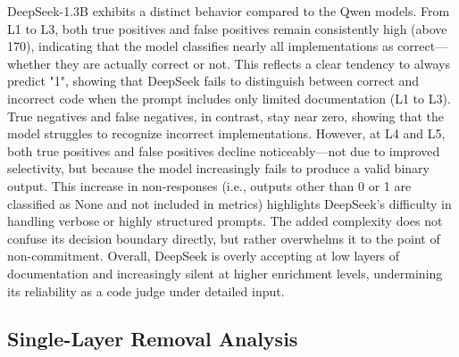 \documentclass[a4paper]{usiinfbachelorproject}
\begin{document}
\noindent
DeepSeek-1.3B exhibits a distinct behavior compared to the Qwen models. From L1 to L3, both true positives and false positives remain consistently high (above 170), indicating that the model classifies nearly all implementations as correct—whether they are actually correct or not. This reflects a clear tendency to always predict "1", showing that DeepSeek fails to distinguish between correct and incorrect code when the prompt includes only limited documentation (L1 to L3). True negatives and false negatives, in contrast, stay near zero, showing that the model struggles to recognize incorrect implementations. However, at L4 and L5, both true positives and false positives decline noticeably—not due to improved selectivity, but because the model increasingly fails to produce a valid binary output. This increase in non-responses (i.e., outputs other than 0 or 1 are classified as None and not included in metrics) highlights DeepSeek's difficulty in handling verbose or highly structured prompts. The added complexity does not confuse its decision boundary directly, but rather overwhelms it to the point of non-commitment. Overall, DeepSeek is overly accepting at low layers of documentation and increasingly silent at higher enrichment levels, undermining its reliability as a code judge under detailed input.

\subsection{Single-Layer Removal Analysis}
\end{document}
